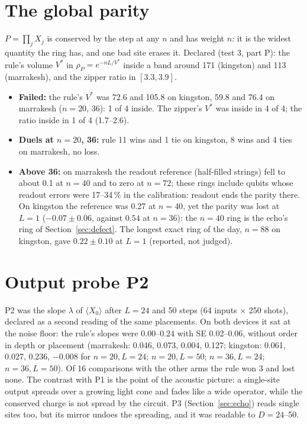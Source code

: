 \documentclass[11pt]{article}
\begin{document}
\section{The global parity}\label{sec:parity}
$P=\prod_jX_j$ is conserved by the step at any $n$ and has weight $n$: it is the widest quantity the ring has, and one
bad site erases it. Declared (test 3, part P): the rule's volume $V^*$ in $\rho_P=e^{-nL/V^*}$ inside a band around
171 (kingston) and 113 (marrakesh), and the zipper ratio in $[3.3,3.9]$.
\begin{itemize}
\item \textbf{Failed:} the rule's $V^*$ was 72.6 and 105.8 on kingston, 59.8 and 76.4 on marrakesh ($n=20$, 36): 1 of 4
  inside. The zipper's $V^*$ was inside in 4 of 4; the ratio inside in 1 of 4 (1.7--2.6).
\item \textbf{Duels at $n=20$, 36:} rule 11 wins and 1 tie on kingston, 8 wins and 4 ties on marrakesh, no loss.
\item \textbf{Above 36:} on marrakesh the readout reference (half-filled strings) fell to about 0.1 at $n=40$ and to
  zero at $n=72$; these rings include qubits whose readout errors were 17--34\,\% in the calibration: readout ends
  the parity there. On
  kingston the reference was 0.27 at $n=40$, yet the parity was lost at $L=1$ ($-0.07\pm0.06$, against $0.54$ at
  $n=36$): the $n=40$ ring is the echo's ring of Section~\ref{sec:defect}. The longest exact ring of the day,
  $n=88$ on kingston, gave $0.22\pm0.10$ at $L=1$ (reported, not judged).
\end{itemize}

\section{Output probe P2}\label{sec:p2}
P2 was the slope $\lambda$ of $\langle X_0\rangle$ after $L=24$ and 50 steps (64 inputs $\times$ 250 shots), declared as a
second reading of the same placements. On both devices it sat at the noise floor: the rule's slopes were
$0.00$--$0.24$ with SE 0.02--0.06, without order in depth or placement (marrakesh: 0.046, 0.073, 0.004, 0.127;
kingston: 0.061, 0.027, 0.236, $-0.008$ for $n=20,L=24$; $n=20,L=50$; $n=36,L=24$; $n=36,L=50$). Of 16 comparisons
with the other arms the rule won 3 and lost none. The contrast with P1 is the
point of the acoustic picture: a single-site output spreads over a growing light cone and fades like a wide
operator, while the conserved charge is not spread by the circuit. P3 (Section~\ref{sec:echo}) reads single sites
too, but its mirror undoes the spreading, and it was readable to $D=24$--50.
\end{document}
